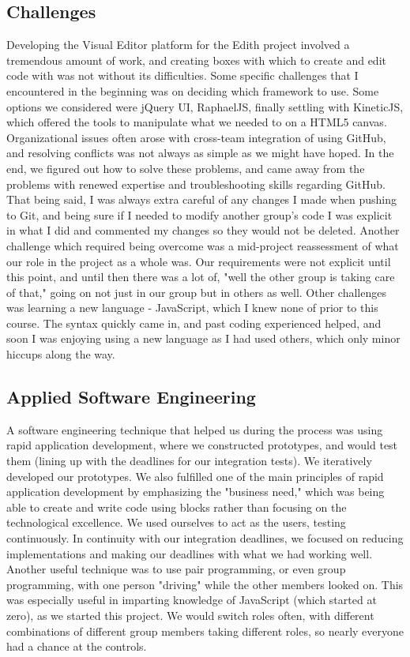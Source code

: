 \documentclass[a4paper]{article}
\begin{document}
\subsection{Challenges}
		
	Developing the Visual Editor platform for the Edith project involved a tremendous amount of work, and creating boxes with which to create and edit code with was not without its difficulties. Some specific challenges that I encountered in the beginning was on deciding which framework to use. Some options we considered were jQuery UI, RaphaelJS, finally settling with KineticJS, which offered the tools to manipulate what we needed to on a HTML5 canvas. Organizational issues often arose with cross-team integration of using GitHub, and resolving conflicts was not always as simple as we might have hoped. In the end, we figured out how to solve these problems, and came away from the problems with renewed expertise and troubleshooting skills regarding GitHub. That being said, I was always extra careful of any changes I made when pushing to Git, and being sure if I needed to modify another group's code I was explicit in what I did and commented my changes so they would not be deleted. Another challenge which required being overcome was a mid-project reassessment of what our role in the project as a whole was. Our requirements were not explicit until this point, and until then there was a lot of, "well the other group is taking care of that," going on not just in our group but in others as well. Other challenges was learning a new language - JavaScript, which I knew none of prior to this course. The syntax quickly came in, and past coding experienced helped, and soon I was enjoying using a new language as I had used others, which only minor hiccups along the way.

\subsection{Applied Software Engineering}
	A software engineering technique that helped us during the process was using rapid application development, where we constructed prototypes, and would test them (lining up with the deadlines for our integration tests). We iteratively developed our prototypes. We also fulfilled one of the main principles of rapid application development by emphasizing the "business need," which was being able to create and write code using blocks rather than focusing on the technological excellence. We used ourselves to act as the users, testing continuously. In continuity with our integration deadlines, we focused on reducing implementations and making our deadlines with what we had working well. Another useful technique was to use pair programming, or even group programming, with one person "driving" while the other members looked on. This was especially useful in imparting knowledge of JavaScript (which started at zero), as we started this project. We would switch roles often, with different combinations of different group members taking different roles, so nearly everyone had a chance at the controls.
\end{document}

